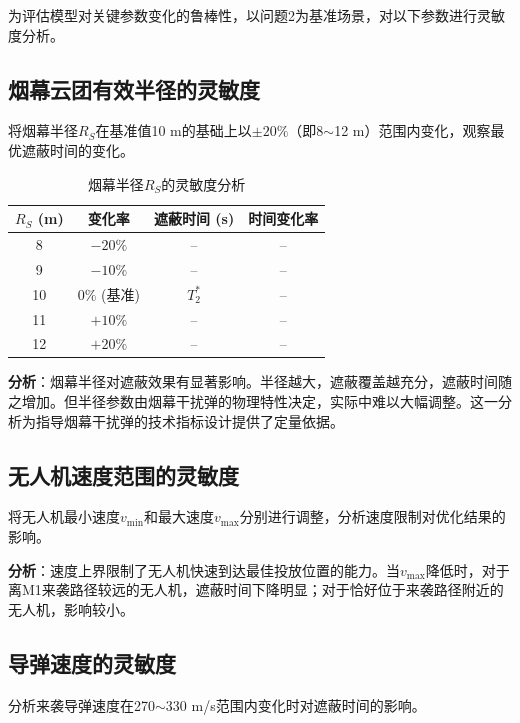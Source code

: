 
为评估模型对关键参数变化的鲁棒性，以问题2为基准场景，对以下参数进行灵敏度分析。

\subsection{烟幕云团有效半径的灵敏度}

将烟幕半径$R_S$在基准值10 m的基础上以$\pm 20\%$（即8$\sim$12 m）范围内变化，观察最优遮蔽时间的变化。

\begin{table}[H]
    \centering
    \caption{烟幕半径$R_S$的灵敏度分析}
    \begin{tabular}{cccc}
        \toprule
        $R_S$ (m) & 变化率 & 遮蔽时间 (s) & 时间变化率 \\
        \midrule
        8 & $-20\%$ & -- & -- \\
        9 & $-10\%$ & -- & -- \\
        10 & $0\%$ (基准) & $T_2^*$ & -- \\
        11 & $+10\%$ & -- & -- \\
        12 & $+20\%$ & -- & -- \\
        \bottomrule
    \end{tabular}
\end{table}

\textbf{分析}：烟幕半径对遮蔽效果有显著影响。半径越大，遮蔽覆盖越充分，遮蔽时间随之增加。但半径参数由烟幕干扰弹的物理特性决定，实际中难以大幅调整。这一分析为指导烟幕干扰弹的技术指标设计提供了定量依据。

\subsection{无人机速度范围的灵敏度}

将无人机最小速度$v_{\min}$和最大速度$v_{\max}$分别进行调整，分析速度限制对优化结果的影响。

\textbf{分析}：速度上界限制了无人机快速到达最佳投放位置的能力。当$v_{\max}$降低时，对于离M1来袭路径较远的无人机，遮蔽时间下降明显；对于恰好位于来袭路径附近的无人机，影响较小。

\subsection{导弹速度的灵敏度}

分析来袭导弹速度在270$\sim$330 m/s范围内变化时对遮蔽时间的影响。

